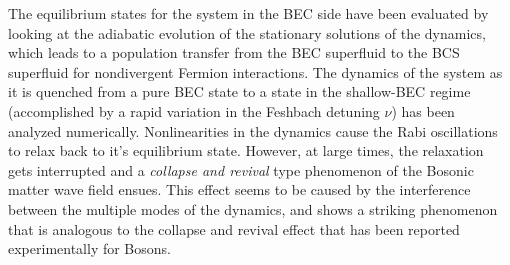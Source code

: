 \documentclass[a4paper,10pt]{article}
\begin{document}
The equilibrium states for the system in the BEC side have been evaluated by looking at the adiabatic evolution of the stationary solutions of the dynamics, which leads to a population transfer from the BEC superfluid to the BCS superfluid for nondivergent Fermion interactions. The dynamics of the system as it is quenched from a pure BEC state to a state in the shallow-BEC  regime (accomplished by a rapid variation in the Feshbach detuning $\nu$) has been analyzed numerically. Nonlinearities in the dynamics cause the Rabi oscillations to relax back to it's equilibrium state. However, at large times, the relaxation gets interrupted and a
\textit{collapse and revival} type phenomenon of the Bosonic matter wave field ensues. This effect seems to be caused by the interference between the multiple modes of the dynamics, and shows a striking phenomenon that is analogous to the collapse and revival effect that has been reported experimentally for Bosons. 
\end{document}
